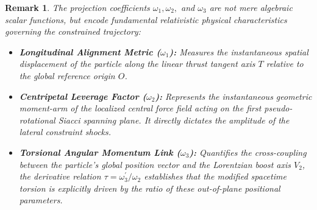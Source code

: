 \documentclass[reqno]{amsart}
\theoremstyle{plain}
\newtheorem{remark}{Remark}
\numberwithin{equation}{section}
\begin{document}
\begin{remark}
The projection coefficients $\omega_1, \omega_2,$ and $\omega_3$ are not mere algebraic scalar functions, but encode fundamental relativistic physical characteristics governing the constrained trajectory:
\begin{itemize}
    \item \textbf{Longitudinal Alignment Metric ($\omega_1$):} Measures the instantaneous spatial displacement of the particle along the linear thrust tangent axis $T$ relative to the global reference origin $O$. 
    \item \textbf{Centripetal Leverage Factor ($\omega_2$):} Represents the instantaneous geometric moment-arm of the localized central force field acting on the first pseudo-rotational Siacci spanning plane. It directly dictates the amplitude of the lateral constraint shocks.
    \item \textbf{Torsional Angular Momentum Link ($\omega_3$):} Quantifies the cross-coupling between the particle's global position vector and the Lorentzian boost axis $V_2$, the derivative relation $\tau = \omega_3^{\prime}/\omega_2$ establishes that the modified spacetime torsion is explicitly driven by the ratio of these out-of-plane positional parameters.
\end{itemize}
\end{remark}
\end{document}
